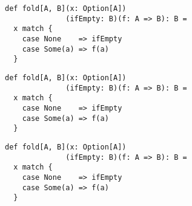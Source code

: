 \documentclass[include/preamble.tex]{subfiles}
\begin{document}
\begin{frame}[fragile]
  \begin{center}
    \begin{lstlisting}[style=scala]
def fold[A, B](x: Option[A])
              (ifEmpty: B)(f: A => B): B =
  x match {
    case None    => ifEmpty
    case Some(a) => f(a)
  }
    \end{lstlisting}
  \end{center}
\end{frame}

\begin{frame}[fragile]
  \begin{center}
    \begin{lstlisting}[style=scala]
def fold[A, B](x: Option[A])
              (ifEmpty: B)(f: A => B): B =
  x match {
    case None    => ifEmpty
    case Some(a) => f(a)
  }
    \end{lstlisting}
  \end{center}
\end{frame}

\begin{frame}[fragile]
  \begin{center}
    \begin{lstlisting}[style=scala]
def fold[A, B](x: Option[A])
              (ifEmpty: B)(f: A => B): B =
  x match {
    case None    => ifEmpty
    case Some(a) => f(a)
  }
    \end{lstlisting}
  \end{center}
\end{frame}
\end{document}
